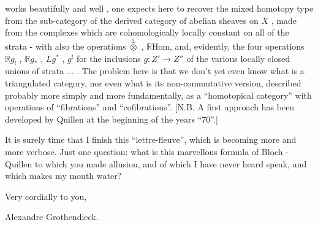 
works beautifully and well , one expects here to recover the
mixed homotopy type from the sub-category  of the derived category
of abelian sheaves on  $X$ , made from the complexes which are
cohomologically locally constant on all of  the strata - with
also the operations $\overset{\mathbb{L}}{\otimes}$ , $\mathbb{R}\mathrm{Hom}$, and, evidently, the four operations
$\mathbb{R}g_!$ , $\mathbb{R}g_*$ , $Lg^*$ , $g^!$  for the inclusions  $g : Z' \to Z''$ of the
various locally closed unions of strata ... .  The problem here
is that we don't yet even know what is a triangulated category,
nor even what is its non-commutative version, described probably
more simply and more fundamentally, as a ``homotopical category''
with operations of ``fibrations'' and ``cofibrations''.  [N.B. A
first approach has been developed by Quillen at the beginning
of the years ``70''.]

It is surely time that I finish this ``lettre-fleuve'', which
is becoming more and more verbose.  Just one question: what is
this marvellous formula of Bloch - Quillen to which you made
allusion, and of which I have never heard speak, and which makes
my mouth water?

Very cordially to you,

Alexandre  Grothendieck.

